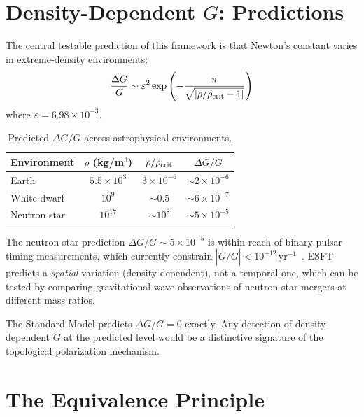 ﻿\documentclass[twocolumn,preprintnumbers,amsmath,amssymb,prd]{revtex4-2}
\begin{document}
\section{Density-Dependent $G$: Predictions}
\label{sec:predictions}

The central testable prediction of this framework is that Newton's constant varies in extreme-density environments:
\begin{equation}
\frac{\Delta G}{G} \sim \varepsilon^2\exp\left(-\frac{\pi}{\sqrt{|\rho/\rho_{\rm crit} - 1|}}\right)
\label{eq:deltaG}
\end{equation}
where $\varepsilon = 6.98 \times 10^{-3}$.

\begin{table}[h]
\caption{Predicted $\Delta G/G$ across astrophysical environments.}
\label{tab:deltaG}
\begin{ruledtabular}
\begin{tabular}{lccc}
Environment & $\rho$ (kg/m$^3$) & $\rho/\rho_{\rm crit}$ & $\Delta G/G$ \\
\hline
Earth & $5.5 \times 10^3$ & $3 \times 10^{-6}$ & $\sim 2 \times 10^{-6}$ \\
White dwarf & $10^9$ & $\sim 0.5$ & $\sim 6 \times 10^{-7}$ \\
Neutron star & $10^{17}$ & $\sim 10^8$ & $\sim 5 \times 10^{-5}$ \\
\end{tabular}
\end{ruledtabular}
\end{table}

The neutron star prediction $\Delta G/G \sim 5 \times 10^{-5}$ is within reach of binary pulsar timing measurements, which currently constrain $|\dot{G}/G| < 10^{-12}\,\text{yr}^{-1}$~\cite{Zhu2019}. ESFT predicts a \emph{spatial} variation (density-dependent), not a temporal one, which can be tested by comparing gravitational wave observations of neutron star mergers at different mass ratios.

The Standard Model predicts $\Delta G/G = 0$ exactly. Any detection of density-dependent $G$ at the predicted level would be a distinctive signature of the topological polarization mechanism.

\section{The Equivalence Principle}
\label{sec:ep}
\end{document}
